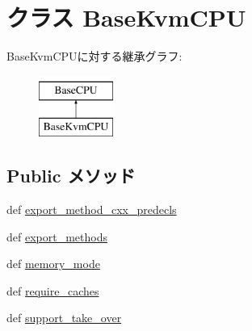 \hypertarget{classBaseKvmCPU_1_1BaseKvmCPU}{
\section{クラス BaseKvmCPU}
\label{classBaseKvmCPU_1_1BaseKvmCPU}
}
BaseKvmCPUに対する継承グラフ:\begin{figure}[H]
\begin{center}
\leavevmode
\includegraphics[height=2cm]{classBaseKvmCPU_1_1BaseKvmCPU}
\end{center}
\end{figure}
\subsection*{Public メソッド}
\begin{DoxyCompactItemize}
\item 
def \hyperlink{classBaseKvmCPU_1_1BaseKvmCPU_a4c94af862ca1bc3ebde2094d5e778ef1}{export\_\-method\_\-cxx\_\-predecls}
\item 
def \hyperlink{classBaseKvmCPU_1_1BaseKvmCPU_ab373c5eaef9a7b80491a097389260f4a}{export\_\-methods}
\item 
def \hyperlink{classBaseKvmCPU_1_1BaseKvmCPU_a53d73a2f804df6a1dcabb22052d09773}{memory\_\-mode}
\item 
def \hyperlink{classBaseKvmCPU_1_1BaseKvmCPU_afcb2c5440cbf782e304bdb958eadf744}{require\_\-caches}
\item 
def \hyperlink{classBaseKvmCPU_1_1BaseKvmCPU_aa201537acf29724056129b8efad43371}{support\_\-take\_\-over}
\end{DoxyCompactItemize}
